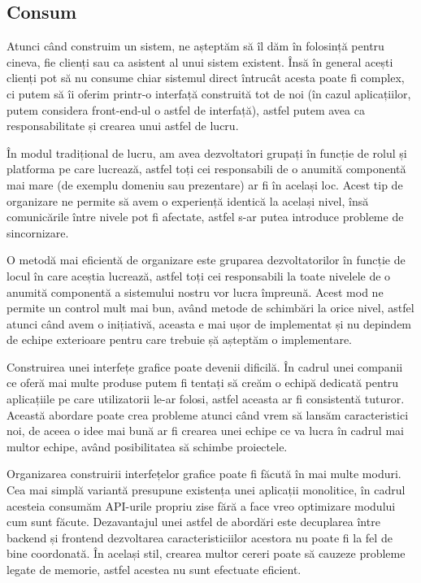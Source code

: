 \subsection{Consum}

Atunci când construim un sistem, ne așteptăm să îl dăm în folosință pentru cineva,
fie clienți sau ca asistent al unui sistem existent. Însă în general acești clienți pot să
nu consume chiar sistemul direct întrucât acesta poate fi complex, ci putem să îi oferim printr-o
interfață construită tot de noi (în cazul aplicațiilor, putem considera front-end-ul o astfel
de interfață), astfel putem avea ca responsabilitate și crearea unui astfel de lucru.

În modul tradițional de lucru, am avea dezvoltatori grupați în funcție de rolul și platforma pe care
lucrează, astfel toți cei responsabili de o anumită componentă mai mare (de exemplu domeniu
sau prezentare) ar fi în același loc. Acest tip de organizare ne permite să avem o 
experiență identică la același nivel, însă comunicările între nivele pot fi afectate, astfel 
s-ar putea introduce probleme de sincornizare.

O metodă mai eficientă de organizare este gruparea dezvoltatorilor în funcție de locul în care
aceștia lucrează, astfel toți cei responsabili la toate nivelele de o anumită componentă a
sistemului nostru vor lucra împreună. Acest mod ne permite un control mult mai bun, având
metode de schimbări la orice nivel, astfel atunci când avem o inițiativă, aceasta e mai ușor 
de implementat și nu depindem de echipe exterioare pentru care trebuie șă așteptăm 
o implementare.

Construirea unei interfețe grafice poate devenii dificilă. În cadrul unei companii
ce oferă mai multe produse putem fi tentați să creăm o echipă dedicată pentru aplicațiile
pe care utilizatorii le-ar folosi, astfel aceasta ar fi consistentă tuturor. Această abordare poate
crea probleme atunci când vrem să lansăm caracteristici noi, de aceea o idee mai bună ar fi
crearea unei echipe ce va lucra în cadrul mai multor echipe, având posibilitatea să schimbe
proiectele.

Organizarea construirii interfețelor grafice poate fi făcută în mai multe moduri.
Cea mai simplă variantă presupune existența unei aplicații monolitice, în cadrul
acesteia consumăm API-urile propriu zise fără a face vreo optimizare modului cum
sunt făcute. Dezavantajul unei astfel de abordări este decuplarea între backend și frontend
dezvoltarea caracteristiciilor acestora nu poate fi la fel de bine coordonată. În același stil,
crearea multor cereri poate să cauzeze probleme legate de memorie, astfel acestea nu sunt
efectuate eficient.


